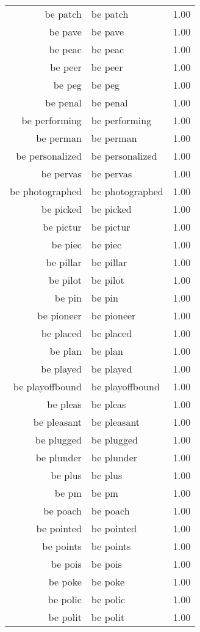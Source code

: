\begin{table}[ht]
\begin{tabular}{rlr}
  be patch & be patch & 1.00 \\ 
  be pave & be pave & 1.00 \\ 
  be peac & be peac & 1.00 \\ 
  be peer & be peer & 1.00 \\ 
  be peg & be peg & 1.00 \\ 
  be penal & be penal & 1.00 \\ 
  be performing & be performing & 1.00 \\ 
  be perman & be perman & 1.00 \\ 
  be personalized & be personalized & 1.00 \\ 
  be pervas & be pervas & 1.00 \\ 
  be photographed & be photographed & 1.00 \\ 
  be picked & be picked & 1.00 \\ 
  be pictur & be pictur & 1.00 \\ 
  be piec & be piec & 1.00 \\ 
  be pillar & be pillar & 1.00 \\ 
  be pilot & be pilot & 1.00 \\ 
  be pin & be pin & 1.00 \\ 
  be pioneer & be pioneer & 1.00 \\ 
  be placed & be placed & 1.00 \\ 
  be plan & be plan & 1.00 \\ 
  be played & be played & 1.00 \\ 
  be playoffbound & be playoffbound & 1.00 \\ 
  be pleas & be pleas & 1.00 \\ 
  be pleasant & be pleasant & 1.00 \\ 
  be plugged & be plugged & 1.00 \\ 
  be plunder & be plunder & 1.00 \\ 
  be plus & be plus & 1.00 \\ 
  be pm & be pm & 1.00 \\ 
  be poach & be poach & 1.00 \\ 
  be pointed & be pointed & 1.00 \\ 
  be points & be points & 1.00 \\ 
  be pois & be pois & 1.00 \\ 
  be poke & be poke & 1.00 \\ 
  be polic & be polic & 1.00 \\ 
  be polit & be polit & 1.00 \\ 

\end{tabular}
\end{table}

